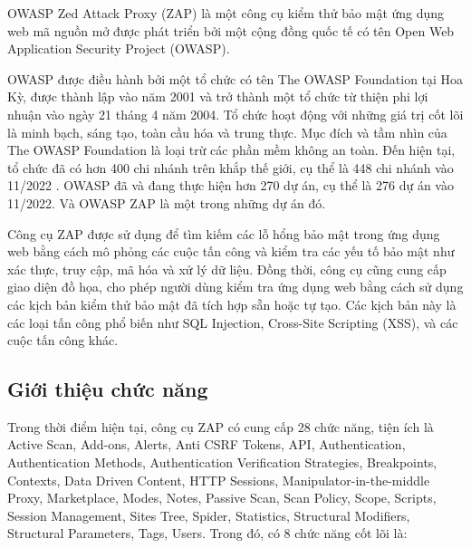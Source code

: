 \tab OWASP Zed Attack Proxy (ZAP) là một công cụ kiểm thử bảo mật ứng dụng web mã nguồn mở được phát triển bởi một cộng đồng quốc tế có tên Open Web Application Security Project (OWASP).
\par

OWASP được điều hành bởi một tổ chức có tên The OWASP Foundation tại Hoa Kỳ, được thành lập vào năm 2001 và trở thành một tổ chức từ thiện phi lợi nhuận vào ngày 21 tháng 4 năm 2004.
Tổ chức hoạt động với những giá trị cốt lõi là minh bạch, sáng tạo, toàn cầu hóa và trung thực.
Mục đích và tầm nhìn của The OWASP Foundation là loại trừ các phần mềm không an toàn.
Đến hiện tại, tổ chức đã có hơn 400 chi nhánh trên khắp thế giới, cụ thể là 448 chi nhánh vào 11/2022 . OWASP đã và đang thực hiện hơn 270 dự án, cụ thể là 276 dự án vào 11/2022. Và OWASP ZAP là một trong những dự án đó.
\par

Công cụ ZAP được sử dụng để tìm kiếm các lỗ hổng bảo mật trong ứng dụng web bằng cách mô phỏng các cuộc tấn công và kiểm tra các yếu tố bảo mật như xác thực, truy cập, mã hóa và xử lý dữ liệu.
Đồng thời, công cụ cũng cung cấp giao diện đồ họa, cho phép người dùng kiểm tra ứng dụng web bằng cách sử dụng các kịch bản kiểm thử bảo mật đã tích hợp sẵn hoặc tự tạo.
Các kịch bản này là các loại tấn công phổ biến như SQL Injection, Cross-Site Scripting (XSS), và các cuộc tấn công khác.

\subsection{Giới thiệu chức năng} \label{subsec:IntroFunc}

\tab Trong thời điểm hiện tại, công cụ ZAP có cung cấp 28 chức năng, tiện ích là Active Scan, Add-ons, Alerts, Anti CSRF Tokens, API, Authentication, Authentication Methods, Authentication Verification Strategies, Breakpoints, Contexts, Data Driven Content, HTTP Sessions, Manipulator-in-the-middle Proxy, Marketplace, Modes, Notes, Passive Scan, Scan Policy, Scope, Scripts, Session Management, Sites Tree, Spider, Statistics, Structural Modifiers, Structural Parameters, Tags, Users.
Trong đó, có 8 chức năng cốt lõi là:


